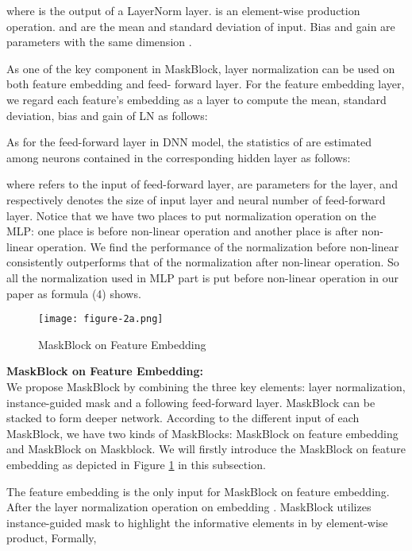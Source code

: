 \documentclass[sigconf]{acmart}
\begin{document}
where  is the output of a LayerNorm layer.  is an element-wise production operation.  and  are the mean and standard deviation of input. Bias  and gain  are parameters with the same dimension .


As one of the key component in MaskBlock, layer normalization can be used on both feature embedding and feed- forward layer. For the feature embedding layer, we regard each feature's embedding as a layer to compute the mean, standard deviation, bias and gain of LN as follows:



As for the feed-forward layer in DNN model, the statistics of  are estimated among neurons contained in the corresponding hidden layer as follows:


where  refers to the input of feed-forward layer,  are parameters for the layer,  and  respectively denotes the  size of input layer and neural number of feed-forward layer. Notice that we have two places to put normalization operation on the MLP: one place is before non-linear operation and another place is after non-linear operation. We find the performance of the normalization before non-linear consistently outperforms that of the normalization after non-linear operation. So all the normalization used in MLP part is put before non-linear operation in our paper as formula (4) shows.

\begin{figure}
  \setlength{\abovecaptionskip}{1pt}
  \texttt{[image: figure-2a.png]}
  \caption{MaskBlock on Feature Embedding}
  \label{Fig.figure-2a}
\end{figure}






\noindent\textbf{MaskBlock on Feature Embedding:}\\
\noindent We propose MaskBlock by combining the three key elements: layer normalization, instance-guided mask and a following feed-forward layer. MaskBlock can be stacked to form deeper network. According to the different input of each MaskBlock, we have two kinds of  MaskBlocks: MaskBlock on feature embedding and MaskBlock on Maskblock. We will firstly introduce the MaskBlock on feature embedding as depicted in Figure \ref{Fig.figure-2a} in this subsection.

The feature embedding   is the only input for MaskBlock on feature embedding. After the layer normalization operation on embedding . MaskBlock utilizes instance-guided mask to highlight the informative elements in  by element-wise product, Formally,
\end{document}
